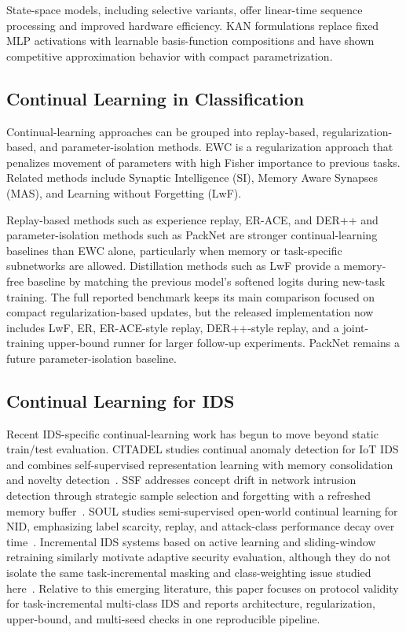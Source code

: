 \documentclass[a4paper,fleqn]{cas-dc}
\begin{document}
State-space models, including selective variants, offer linear-time sequence processing and improved hardware efficiency. KAN formulations replace fixed MLP activations with learnable basis-function compositions and have shown competitive approximation behavior with compact parametrization.

\subsection{Continual Learning in Classification}
Continual-learning approaches can be grouped into replay-based, regularization-based, and parameter-isolation methods. EWC is a regularization approach that penalizes movement of parameters with high Fisher importance to previous tasks. Related methods include Synaptic Intelligence (SI), Memory Aware Synapses (MAS), and Learning without Forgetting (LwF).

Replay-based methods such as experience replay, ER-ACE, and DER++ and parameter-isolation methods such as PackNet are stronger continual-learning baselines than EWC alone, particularly when memory or task-specific subnetworks are allowed. Distillation methods such as LwF provide a memory-free baseline by matching the previous model's softened logits during new-task training. The full reported benchmark keeps its main comparison focused on compact regularization-based updates, but the released implementation now includes LwF, ER, ER-ACE-style replay, DER++-style replay, and a joint-training upper-bound runner for larger follow-up experiments. PackNet remains a future parameter-isolation baseline.

\subsection{Continual Learning for IDS}
Recent IDS-specific continual-learning work has begun to move beyond static train/test evaluation. CITADEL studies continual anomaly detection for IoT IDS and combines self-supervised representation learning with memory consolidation and novelty detection~\cite{li2025citadel}. SSF addresses concept drift in network intrusion detection through strategic sample selection and forgetting with a refreshed memory buffer~\cite{zhang2025ssf}. SOUL studies semi-supervised open-world continual learning for NID, emphasizing label scarcity, replay, and attack-class performance decay over time~\cite{amalapuram2024soul}. Incremental IDS systems based on active learning and sliding-window retraining similarly motivate adaptive security evaluation, although they do not isolate the same task-incremental masking and class-weighting issue studied here~\cite{boukela2023incremental}. Relative to this emerging literature, this paper focuses on protocol validity for task-incremental multi-class IDS and reports architecture, regularization, upper-bound, and multi-seed checks in one reproducible pipeline.
\end{document}
